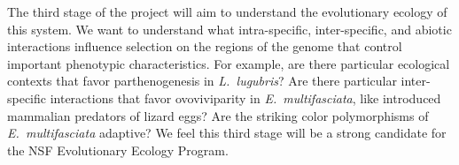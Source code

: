The third stage of the project will aim to understand the evolutionary ecology
of this system.
We want to understand what intra-specific, inter-specific, and abiotic
interactions influence selection on the regions of the genome that control
important phenotypic characteristics.
For example, are there particular ecological contexts that favor
parthenogenesis in \emph{L.\ lugubris}?
Are there particular inter-specific interactions that favor ovoviviparity in
\emph{E.\ multifasciata}, like introduced mammalian predators of lizard eggs?
Are the striking color polymorphisms of \emph{E.\ multifasciata} adaptive?
We feel this third stage will be a strong candidate for the NSF Evolutionary
Ecology Program.

